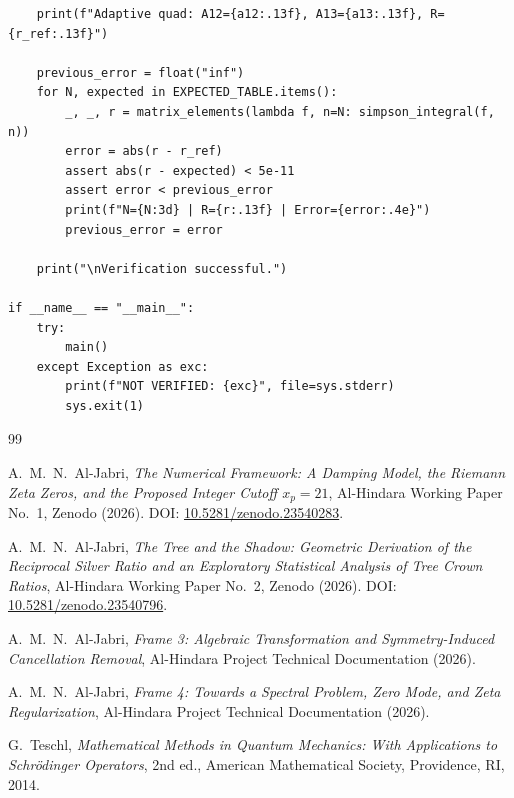 \documentclass[11pt,a4paper]{article}
\begin{document}
\begin{verbatim}
    print(f"Adaptive quad: A12={a12:.13f}, A13={a13:.13f}, R={r_ref:.13f}")
    
    previous_error = float("inf")
    for N, expected in EXPECTED_TABLE.items():
        _, _, r = matrix_elements(lambda f, n=N: simpson_integral(f, n))
        error = abs(r - r_ref)
        assert abs(r - expected) < 5e-11
        assert error < previous_error
        print(f"N={N:3d} | R={r:.13f} | Error={error:.4e}")
        previous_error = error
        
    print("\nVerification successful.")

if __name__ == "__main__":
    try:
        main()
    except Exception as exc:
        print(f"NOT VERIFIED: {exc}", file=sys.stderr)
        sys.exit(1)
\end{verbatim}

\begin{thebibliography}{99}

A.~M.~N.~Al-Jabri, \emph{The Numerical Framework: A Damping Model, the Riemann Zeta Zeros, and the Proposed Integer Cutoff $x_p = 21$}, Al-Hindara Working Paper No.~1, Zenodo (2026). DOI: \href{https://doi.org/10.5281/zenodo.23540283}{10.5281/zenodo.23540283}.

A.~M.~N.~Al-Jabri, \emph{The Tree and the Shadow: Geometric Derivation of the Reciprocal Silver Ratio and an Exploratory Statistical Analysis of Tree Crown Ratios}, Al-Hindara Working Paper No.~2, Zenodo (2026). DOI: \href{https://doi.org/10.5281/zenodo.23540796}{10.5281/zenodo.23540796}.

A.~M.~N.~Al-Jabri, \emph{Frame 3: Algebraic Transformation and Symmetry-Induced Cancellation Removal}, Al-Hindara Project Technical Documentation (2026).

A.~M.~N.~Al-Jabri, \emph{Frame 4: Towards a Spectral Problem, Zero Mode, and Zeta Regularization}, Al-Hindara Project Technical Documentation (2026).

G.~Teschl, \emph{Mathematical Methods in Quantum Mechanics: With Applications to Schr\"odinger Operators}, 2nd ed., American Mathematical Society, Providence, RI, 2014.

\end{thebibliography}
\end{document}
